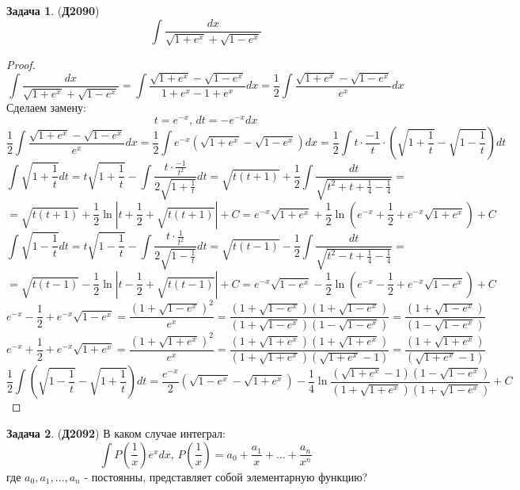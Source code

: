 \documentclass[12pt]{article}
\theoremstyle{definition}
\newtheorem{problem}{Задача}
\DeclareMathOperator{\dint}{\displaystyle\int}
\begin{document}
\begin{problem}(\textbf{Д2090})
	$$
		\dint \dfrac{dx}{\sqrt{1 + e^x} + \sqrt{1 - e^{x}}}
	$$
\end{problem}
\begin{proof}
	$$
		\dint \dfrac{dx}{\sqrt{1 + e^x} + \sqrt{1 - e^{x}}} = \dint \dfrac{\sqrt{1 + e^x} - \sqrt{1-e^x}}{1 + e^{x} - 1 + e^{x}}dx = \dfrac{1}{2}\dint \dfrac{\sqrt{1 + e^x} - \sqrt{1-e^x}}{e^x}dx 
	$$
	Сделаем замену:
	$$
		t = e^{-x}, \, dt = -e^{-x}dx 
	$$
	$$
		\dfrac{1}{2}\dint \dfrac{\sqrt{1 + e^x} - \sqrt{1-e^x}}{e^x}dx = \dfrac{1}{2}\dint e^{-x}(\sqrt{1 + e^x} - \sqrt{1-e^x})dx = \dfrac{1}{2}\dint t{\cdot}\dfrac{-1}{t}{\cdot}\left(\sqrt{1 + \dfrac{1}{t}} - \sqrt{1 -\dfrac{1}{t}}\right)dt
	$$
	$$
		\dint \sqrt{1 + \dfrac{1}{t}}dt = t\sqrt{1 + \dfrac{1}{t}} - \dint \dfrac{t{\cdot}\tfrac{-1}{t^2}}{2\sqrt{1 + \tfrac{1}{t}}}dt = \sqrt{t(t+1)} + \dfrac{1}{2}\dint \dfrac{dt}{\sqrt{t^2 + t + \tfrac{1}{4} - \tfrac{1}{4}}} =
	$$
	$$
		=	\sqrt{t(t+1)} + \dfrac{1}{2}\ln{\left|t + \dfrac{1}{2} + \sqrt{t(t+1)} \right|} + C = e^{-x}\sqrt{1 + e^x} + \dfrac{1}{2}\ln{\left(e^{-x} + \dfrac{1}{2} + e^{-x}\sqrt{1 + e^x}\right)} + C
	$$
	$$
		\dint \sqrt{1 - \dfrac{1}{t}}dt = t\sqrt{1 - \dfrac{1}{t}} - \dint \dfrac{t{\cdot}\tfrac{1}{t^2}}{2\sqrt{1 - \tfrac{1}{t}}}dt = \sqrt{t(t-1)} - \dfrac{1}{2}\dint \dfrac{dt}{\sqrt{t^2 - t + \tfrac{1}{4} - \tfrac{1}{4}}} =
	$$
	$$
		=	\sqrt{t(t-1)} - \dfrac{1}{2}\ln{\left|t - \dfrac{1}{2} + \sqrt{t(t-1)} \right|} + C = e^{-x}\sqrt{1 - e^x} - \dfrac{1}{2}\ln{\left(e^{-x} - \dfrac{1}{2} + e^{-x}\sqrt{1 - e^x}\right)} + C
	$$
	$$
		e^{-x} - \dfrac{1}{2} + e^{-x}\sqrt{1 - e^x} = \dfrac{(1 +\sqrt{1 -e^{x}})^2}{e^x} = \dfrac{(1 +\sqrt{1 -e^{x}})(1 +\sqrt{1 -e^{x}})}{(1 +\sqrt{1 -e^{x}})(1 -\sqrt{1 -e^{x}})} = \dfrac{(1 +\sqrt{1 -e^{x}})}{(1 -\sqrt{1 -e^{x}})}
	$$
	$$
		e^{-x} + \dfrac{1}{2} + e^{-x}\sqrt{1 + e^x} = \dfrac{(1 +\sqrt{1 +e^{x}})^2}{e^x} = \dfrac{(1 +\sqrt{1 +e^{x}})(1 +\sqrt{1 +e^{x}})}{(1 +\sqrt{1 +e^{x}})(\sqrt{1 +e^{x}} - 1)} = \dfrac{(1 +\sqrt{1 +e^{x}})}{( \sqrt{1 + e^{x}} - 1)}
	$$
	$$
		\dfrac{1}{2}\dint\left(\sqrt{1 - \dfrac{1}{t}} - \sqrt{1 +\dfrac{1}{t}}\right)dt = \dfrac{e^{-x}}{2}(\sqrt{1 - e^{x}} - \sqrt{1 + e^x}) - \dfrac{1}{4}\ln{\dfrac{( \sqrt{1 + e^{x}} - 1)(1- \sqrt{1 - e^{x}} )}{(1 +\sqrt{1 +e^{x}})(1 +\sqrt{1 -e^{x}})} } + C
	$$
\end{proof}
\begin{problem}(\textbf{Д2092})
	В каком случае интеграл:
	$$
		\dint P\left(\dfrac{1}{x}\right)e^xdx, \, P\left(\dfrac{1}{x}\right) = a_0 + \dfrac{a_1}{x} + \dotsc + \dfrac{a_n}{x^n}
	$$
	где $a_0, a_1, \dotsc, a_n$ - постоянны, представляет собой элементарную функцию?
\end{problem}
\end{document}
